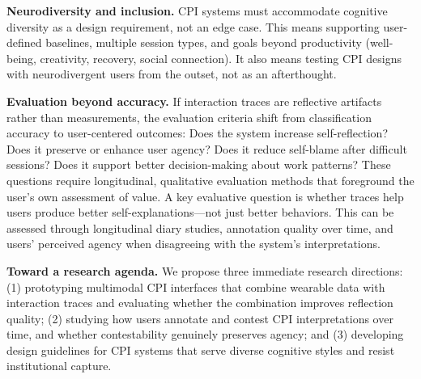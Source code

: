 \textbf{Neurodiversity and inclusion.} CPI systems must accommodate cognitive diversity as a design requirement, not an edge case. This means supporting user-defined baselines, multiple session types, and goals beyond productivity (well-being, creativity, recovery, social connection). It also means testing CPI designs with neurodivergent users from the outset, not as an afterthought.

\textbf{Evaluation beyond accuracy.} If interaction traces are reflective artifacts rather than measurements, the evaluation criteria shift from classification accuracy to user-centered outcomes: Does the system increase self-reflection? Does it preserve or enhance user agency? Does it reduce self-blame after difficult sessions? Does it support better decision-making about work patterns? These questions require longitudinal, qualitative evaluation methods that foreground the user's own assessment of value. A key evaluative question is whether traces help users produce better self-explanations---not just better behaviors. This can be assessed through longitudinal diary studies, annotation quality over time, and users' perceived agency when disagreeing with the system's interpretations.

\textbf{Toward a research agenda.} We propose three immediate research directions: (1) prototyping multimodal CPI interfaces that combine wearable data with interaction traces and evaluating whether the combination improves reflection quality; (2) studying how users annotate and contest CPI interpretations over time, and whether contestability genuinely preserves agency; and (3) developing design guidelines for CPI systems that serve diverse cognitive styles and resist institutional capture.


